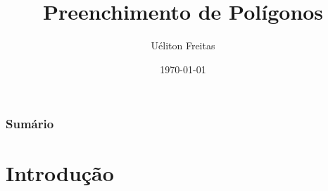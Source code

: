 \documentclass{beamer}
\title[Computação Gráfica]{Preenchimento de Polígonos} %
\author{Uéliton Freitas} %
\institute[UFMS] %
{
Universidade Católica Dom Bosco - UCDB \\ %
\medskip
\textit{freitas.ueliton@gmail.com} %
}
\date{\today} %
\begin{document}
\begin{frame}
\titlepage %
\end{frame}

\begin{frame}
\frametitle{Sumário} %
\tableofcontents %
\end{frame}





\section{Introdução} 

\end{document}
